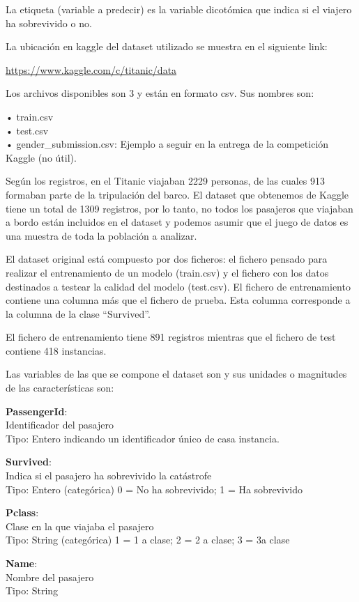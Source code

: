 \documentclass[
]{article}
\begin{document}
La etiqueta (variable a predecir) es la variable dicotómica que indica
si el viajero ha sobrevivido o no.

La ubicación en kaggle del dataset utilizado se muestra en el siguiente
link:

\url{https://www.kaggle.com/c/titanic/data}

Los archivos disponibles son 3 y están en formato csv. Sus nombres son:

• train.csv\\
• test.csv\\
• gender\_submission.csv: Ejemplo a seguir en la entrega de la
competición Kaggle (no útil).

Según los registros, en el Titanic viajaban 2229 personas, de las cuales
913 formaban parte de la tripulación del barco. El dataset que obtenemos
de Kaggle tiene un total de 1309 registros, por lo tanto, no todos los
pasajeros que viajaban a bordo están incluidos en el dataset y podemos
asumir que el juego de datos es una muestra de toda la población a
analizar.

El dataset original está compuesto por dos ficheros: el fichero pensado
para realizar el entrenamiento de un modelo (train.csv) y el fichero con
los datos destinados a testear la calidad del modelo (test.csv). El
fichero de entrenamiento contiene una columna más que el fichero de
prueba. Esta columna corresponde a la columna de la clase ``Survived''.

El fichero de entrenamiento tiene 891 registros mientras que el fichero
de test contiene 418 instancias.

Las variables de las que se compone el dataset son y sus unidades o
magnitudes de las características son:

\textbf{PassengerId}:\\
Identificador del pasajero\\
Tipo: Entero indicando un identificador único de casa instancia.

\textbf{Survived}:\\
Indica si el pasajero ha sobrevivido la catástrofe\\
Tipo: Entero (categórica) 0 = No ha sobrevivido; 1 = Ha sobrevivido

\textbf{Pclass}:\\
Clase en la que viajaba el pasajero\\
Tipo: String (categórica) 1 = 1 a clase; 2 = 2 a clase; 3 = 3a clase

\textbf{Name}:\\
Nombre del pasajero\\
Tipo: String
\end{document}
